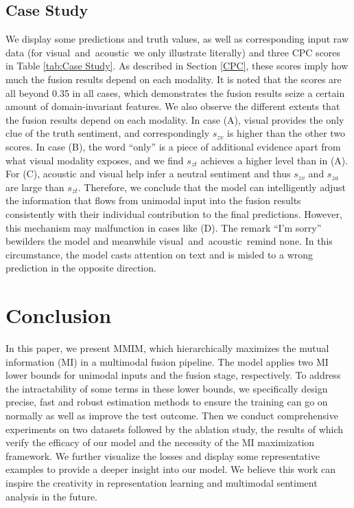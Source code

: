 \documentclass[11pt]{article}
\newcommand{\mv}{visual}
\newcommand{\ma}{acoustic}
\newcommand{\modelname}{MMIM}
\begin{document}
\subsection{Case Study} \label{Case Study}
We display some predictions and truth values, as well as corresponding input raw data (for \mv~and~\ma~we only illustrate literally) and three CPC scores in Table \ref{tab:Case Study}. 
As described in Section \ref{CPC}, these scores imply how much the fusion results depend on each modality.
It is noted that the scores are all beyond 0.35 in all cases, which demonstrates the fusion results seize a certain amount of domain-invariant features. 
We also observe the different extents that the fusion results depend on each modality. 
In case (A), visual provides the only clue of the truth sentiment, and correspondingly $s_{zv}$ is higher than the other two scores. 
In case (B), the word ``only'' is a piece of additional evidence apart from what visual modality exposes, and we find $s_{zt}$ achieves a higher level than in (A).
For (C), acoustic and visual help infer a neutral sentiment and thus $s_{zv}$ and $s_{za}$ are large than $s_{zt}$.
Therefore, we conclude that the model can intelligently adjust the information that flows from unimodal input into the fusion results consistently with their individual contribution to the final predictions.
However, this mechanism may malfunction in cases like (D). The remark ``I'm sorry'' bewilders the model and meanwhile \mv~and~\ma~remind none. In this circumstance, the model casts attention on text and is misled to a wrong prediction in the opposite direction.

%
 
\section{Conclusion}
In this paper, we present \modelname, which hierarchically maximizes the mutual information (MI) in a multimodal fusion pipeline.
The model applies two MI lower bounds for unimodal inputs and the fusion stage, respectively.
To address the intractability of some terms in these lower bounds, we specifically design precise, fast and robust estimation methods to ensure the training can go on normally as well as improve the test outcome.
Then we conduct comprehensive experiments on two datasets followed by the ablation study, the results of which verify the efficacy of our model and the necessity of the MI maximization framework.
We further visualize the losses and display some representative examples to provide a deeper insight into our model.
We believe this work can inspire the creativity in representation learning and multimodal sentiment analysis in the future.
\end{document}
